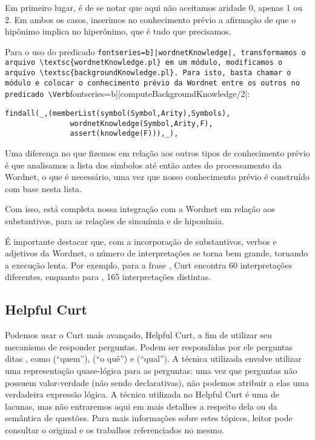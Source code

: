 	Em primeiro lugar, é de se notar que aqui não aceitamos aridade 0, apenas 1 ou 2. Em ambos os casos, inserimos no conhecimento prévio a afirmação de que o hipônimo implica no hiperônimo, que é tudo que precisamos.
	

	Para o uso do predicado \Verb[fontseries=b]|wordnetKnowledge|, transformamos o arquivo \textsc{wordnetKnowledge.pl} em um módulo, modificamos o arquivo \textsc{backgroundKnowledge.pl}. Para isto, basta chamar o módulo e colocar o conhecimento prévio da Wordnet entre os outros no predicado \Verb[fontseries=b]|computeBackgroundKnowledge/2|:
	
	\begin{Verbatim}[fontseries=b, gobble=1]
	findall(_,(memberList(symbol(Symbol,Arity),Symbols),
	           wordnetKnowledge(Symbol,Arity,F),
	           assert(knowledge(F))),_),
	\end{Verbatim}
	
	Uma diferença no que fizemos em relação aos outros tipos de conhecimento prévio é que analisamos a lista dos símbolos até então antes do processamento da Wordnet, o que é necessário, uma vez que nosso conhecimento prévio é construído com base nesta lista.
	
	Com isso, está completa nossa integração com a Wordnet em relação aos substantivos, para as relações de sinonímia e de hiponímia.

	É importante destacar que, com a incorporação de substantivos, verbos e adjetivos da Wordnet, o número de interpretações se torna bem grande, tornando a execução lenta. Por exemplo, para a frase , Curt encontra 60 interpretações diferentes, enquanto para , 165 interpretações distintas.

	\subsection{Helpful Curt}

	Podemos usar o Curt mais avançado, Helpful Curt, a fim de utilizar seu mecanismo de responder perguntas. Podem ser respondidas por ele perguntas ditas , como  (``quem''),  (``o quê'') e  (``qual''). A técnica utilizada envolve utilizar uma representação quase-lógica para as perguntas: uma vez que perguntas não possuem valor-verdade (não sendo declarativas), não podemos atribuir a elas uma verdadeira expressão lógica. A técnica utilizada no Helpful Curt é uma de lacunas, mas não entraremos aqui em mais detalhes a respeito dela ou da semântica de questões. Para mais informações sobre estes tópicos, leitor pode consultar o original \citep[pp.~293--300, 303--304]{BlackburnBos:2005} e os trabalhos referenciados no mesmo.
